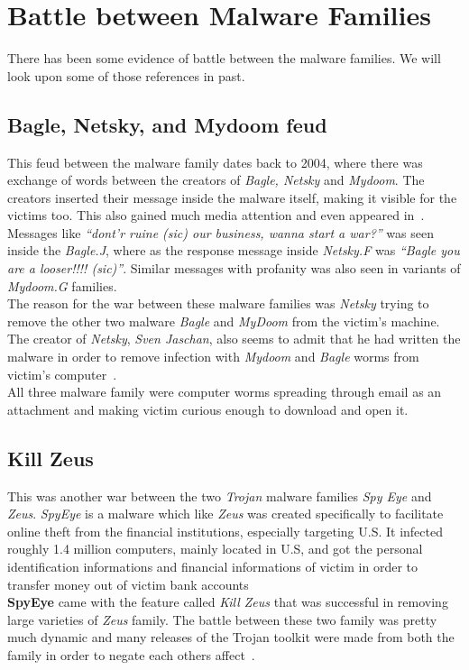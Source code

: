 \section{Battle between Malware Families}
\label{sec:Battle between Malware Families}
There has been some evidence of battle between the malware families. We will look upon some of those references in past.
\subsection{Bagle, Netsky, and Mydoom feud}
\label{sub:Bagle, Netsky, and Mydoom feud}
This feud between the malware family dates back to 2004, where there was exchange of words between the creators of \emph{Bagle, Netsky} and \emph{Mydoom}.
The creators inserted their message inside the malware itself, making it visible for the victims too. This also gained much media attention and even appeared in~\cite[BBC]{bbccover}.
Messages like \emph{``dont'r ruine (sic) our business, wanna start a war?''} was seen inside the \emph{Bagle.J}, where as the response message inside \emph{Netsky.F} was \emph{``Bagle \- you are a looser!!!! (sic)''}.
Similar messages with profanity was also seen in variants of \emph{Mydoom.G} families.\\
The reason for the war between these malware families was \emph{Netsky} trying to remove the other two malware \emph{Bagle} and \emph{MyDoom} from the victim's machine.
The creator of \emph{Netsky}, \emph{Sven Jaschan}, also seems to admit that he had written the malware in order to remove infection with \emph{Mydoom} and \emph{Bagle} worms from victim's computer~\cite[]{wikinetsky}.\\
All three malware family were computer worms spreading through email as an attachment and making victim curious enough to download and open it.
\subsection{Kill Zeus}
\label{sub:Kill Zeus}
This was another war between the two \emph{Trojan} malware families \emph{Spy Eye} and \emph{Zeus}.
\emph{SpyEye} is a malware which like \emph{Zeus} was created specifically to facilitate online theft from the financial institutions, especially targeting U.S.
It infected roughly 1.4 million computers, mainly located in U.S, and got the personal identification informations and financial informations of victim in order to transfer money out of victim bank accounts~\cite[]{fbispyeye} \\
\textbf{SpyEye} came with the feature called \emph{Kill Zeus} that was successful in removing large varieties of \emph{Zeus} family.
The battle between these two family was pretty much dynamic and many releases of the Trojan toolkit were made from both the family in order to negate each others affect~\cite[]{sanszeus}.






